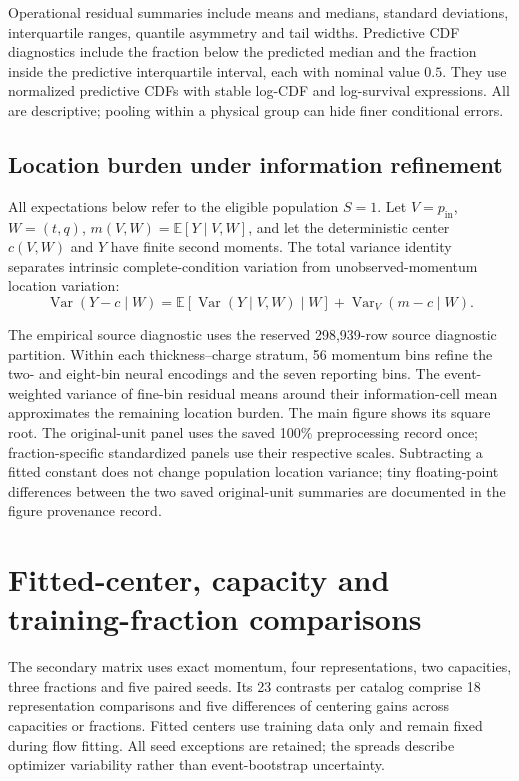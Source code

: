 \documentclass[11pt]{article}
\newcommand{\pin}{p_{\mathrm{in}}}
\begin{document}
Operational residual summaries include means and medians, standard deviations,
interquartile ranges, quantile asymmetry and tail widths. Predictive CDF
diagnostics include the fraction below the predicted median and the fraction
inside the predictive interquartile interval, each with nominal value $0.5$.
They use normalized predictive CDFs with stable log-CDF and log-survival
expressions. All are descriptive; pooling within a physical group can hide
finer conditional errors.

\subsection{Location burden under information refinement}
All expectations below refer to the eligible population $S=1$. Let
$V=\pin$, $W=(t,q)$, $m(V,W)=\mathbb E[Y\mid V,W]$, and let the
deterministic center $c(V,W)$ and $Y$ have finite second moments. The total
variance identity separates intrinsic complete-condition variation from
unobserved-momentum location variation:
\begin{equation}
 \operatorname{Var}(Y-c\mid W)=
 \mathbb E[\operatorname{Var}(Y\mid V,W)\mid W]
 +\operatorname{Var}_V(m-c\mid W).
\end{equation}


The empirical source diagnostic uses the reserved 298,939-row source
diagnostic partition. Within each thickness--charge stratum, 56 momentum
bins refine the two- and eight-bin neural encodings and the seven reporting
bins. The event-weighted variance of fine-bin residual means around their
information-cell mean approximates the remaining location burden. The main
figure shows its square root. The original-unit panel uses the saved 100\%
preprocessing record once; fraction-specific standardized panels use their
respective scales. Subtracting a fitted constant does not change population
location variance; tiny floating-point differences between the two saved
original-unit summaries are documented in the figure provenance record.

\section{Fitted-center, capacity and training-fraction comparisons}
\label{sec:secondary}

The secondary matrix uses exact momentum, four representations, two capacities,
three fractions and five paired seeds. Its 23 contrasts per catalog comprise
18 representation comparisons and five differences of centering gains across
capacities or fractions. Fitted centers use training data only and remain
fixed during flow fitting. All seed exceptions are retained; the spreads
describe optimizer variability rather than event-bootstrap uncertainty.
\end{document}
